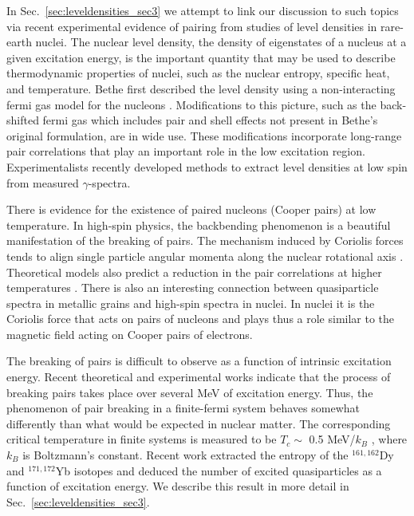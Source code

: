 \documentclass[preprint,rmp,aps,floatfix]{revtex4}
\begin{document}
In Sec.~\ref{sec:leveldensities_sec3} we attempt to link our discussion
to such topics via 
recent experimental evidence of pairing from studies
of level densities in rare-earth nuclei. 
The nuclear level density, the density of eigenstates of a nucleus
at a given excitation energy, is the important quantity that may be
used to describe thermodynamic properties of nuclei, such as the
nuclear entropy, specific heat, and temperature.
Bethe first described the level density using a
non-interacting fermi gas model
for the nucleons \cite{bethe1}. Modifications to this picture, such as the
back-shifted fermi gas which includes pair and
shell effects \cite{back_shift,newton56}
not present in Bethe's original formulation, are in
wide use.  These modifications incorporate 
long-range pair correlations that play an important role
in the low excitation region.
Experimentalists recently developed methods
\cite{oslo1,oslo2} to extract level densities at low spin from
measured $\gamma$-spectra. 

There is evidence for the existence of paired nucleons 
(Cooper pairs) at low temperature. In high-spin physics, 
the backbending phenomenon is a beautiful manifestation of 
the breaking of pairs. The mechanism induced by Coriolis 
forces tends to align single particle angular momenta along 
the nuclear rotational axis 
\cite{stephenssimon,johnson1971,ried80,faessler76}. 
Theoretical models also 
predict a reduction in the pair correlations at 
higher temperatures \cite{mottelson60,muhlhans83,dossing95}.
There is also an interesting connection between quasiparticle spectra
in metallic grains and high-spin spectra in nuclei. In nuclei it is the 
Coriolis force that acts on pairs of nucleons and plays thus a
role similar to the magnetic field acting on Cooper pairs of electrons.

The breaking of pairs is difficult to observe as a 
function of intrinsic excitation energy. Recent 
theoretical \cite{dossing95} and experimental \cite{oslo2,oslo3} works 
indicate that the process of breaking pairs takes place 
over several MeV of excitation energy. Thus, the 
phenomenon of pair breaking in a finite-fermi system behaves 
somewhat differently than what would be expected in nuclear matter. 
The corresponding critical 
temperature in finite systems is measured to be 
$T_c \sim $ 0.5 MeV/$k_B$ \cite{schiller2001}, 
where $k_B$ is Boltzmann's constant.
Recent work extracted the entropy of the 
$^{161,162}$Dy and $^{171,172}$Yb isotopes and deduced the 
number of excited quasiparticles as a function of excitation energy. 
We describe this result in more detail in 
Sec.~\ref{sec:leveldensities_sec3}.
\end{document}
